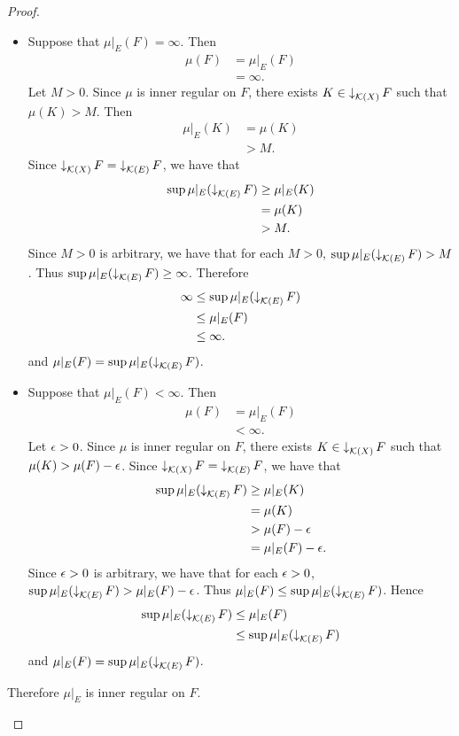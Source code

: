 \documentclass{book}
\begin{document}
\begin{proof}
\begin{enumerate}
			\begin{itemize}
				\item Suppose that $\mu|_E(F) = \infty$. Then  
				\begin{align*}
					\mu(F)
					& = \mu|_E(F) \\
					& = \infty.
				\end{align*}
				Let $M > 0$. Since $\mu$ is inner regular on $F$, there exists $K \in \operatorname{\downarrow}_{\mathcal{K}(X)} F$ such that $\mu(K) > M$. Then 
				\begin{align*}
					\mu|_E(K)
					& = \mu(K) \\
					& > M.
				\end{align*}
				Since $\operatorname{\downarrow}_{\mathcal{K}(X)} F = \operatorname{\downarrow}_{\mathcal{K}(E)} F$, we have that 
				\begin{align*}
					\sup \mu|_E(\operatorname{\downarrow}_{\mathcal{K}(E)} F) 
					& \geq \mu|_E(K) \\
					& = \mu(K) \\
					& > M.
				\end{align*}
				Since $M > 0$ is arbitrary, we have that for each $M > 0$, $\sup \mu|_E(\operatorname{\downarrow}_{\mathcal{K}(E)} F) > M$. Thus $\sup \mu|_E(\operatorname{\downarrow}_{\mathcal{K}(E)} F) \geq \infty$. Therefore
				\begin{align*}
					\infty 
					& \leq \sup \mu|_E(\operatorname{\downarrow}_{\mathcal{K}(E)} F) \\
					& \leq \mu|_E(F) \\ 
					& \leq \infty. 
				\end{align*} 
				and $\mu|_E(F) = \sup \mu|_E(\operatorname{\downarrow}_{\mathcal{K}(E)} F)$.
				\item Suppose that $\mu|_E(F) < \infty$. Then  
				\begin{align*}
					\mu(F)
					& = \mu|_E(F) \\
					& < \infty.
				\end{align*}
				Let $\epsilon > 0$. Since $\mu$ is inner regular on $F$, there exists $K \in \operatorname{\downarrow}_{\mathcal{K}(X)} F$ such that $\mu(K) > \mu(F) - \epsilon$. Since $\operatorname{\downarrow}_{\mathcal{K}(X)} F = \operatorname{\downarrow}_{\mathcal{K}(E)} F$, we have that 
				\begin{align*}
					\sup \mu|_E(\operatorname{\downarrow}_{\mathcal{K}(E)} F)
					& \geq \mu|_E(K) \\
					& = \mu(K) \\
					& > \mu(F) - \epsilon \\
					& = \mu|_E(F) - \epsilon. 
				\end{align*}
				Since $\epsilon >0$ is arbitrary, we have that for each $\epsilon >0$, $\sup \mu|_E(\operatorname{\downarrow}_{\mathcal{K}(E)} F) > \mu|_E(F) - \epsilon$. Thus $\mu|_E(F) \leq \sup \mu|_E(\operatorname{\downarrow}_{\mathcal{K}(E)} F)$. Hence  
				\begin{align*}
					\sup \mu|_E(\operatorname{\downarrow}_{\mathcal{K}(E)} F)
					& \leq \mu|_E(F) \\ 
					& \leq \sup \mu|_E(\operatorname{\downarrow}_{\mathcal{K}(E)} F)
				\end{align*}
				and $\mu|_E(F) = \sup \mu|_E(\operatorname{\downarrow}_{\mathcal{K}(E)} F)$. 
			\end{itemize}
			Therefore $\mu|_E$ is inner regular on $F$. 
		\end{enumerate}
	\end{proof}
\end{document}
